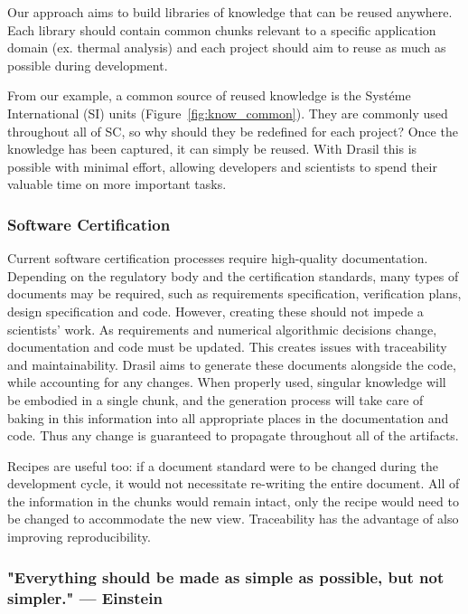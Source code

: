 \documentclass{sig-alternate-05-2015}
\newcommand{\lss}{Drasil}
\begin{document}
Our approach aims to build libraries of knowledge that can be reused anywhere.
Each library should contain common chunks relevant to a specific application
domain (ex. thermal analysis) and each project should aim to reuse as much as
possible during development.

From our example, a common source of reused knowledge is the Syst\'{e}me
International (SI) units (Figure~\ref{fig:know_common}). They are commonly
used throughout all of SC, so why should they be redefined for each
project? Once the knowledge has been captured, it can simply be reused.
With \lss{} this is possible with minimal effort, allowing developers and
scientists to spend their valuable time on more important tasks.

\subsubsection{Software Certification} \label{sssec:adv_cert}

Current software certification processes require high-quality documentation.
Depending on the regulatory body and the certification standards, many
types of documents may be required, such as requirements specification,
verification plans, design specification and code. 
However, creating these should not impede a scientists' work.  As requirements
and numerical algorithmic decisions change, documentation and code must be
updated.  This creates issues with traceability and maintainability.
\lss{} aims to generate these documents alongside the code, while accounting
for any changes. When properly used, singular knowledge will be embodied in
a single chunk, and the generation process will take care of baking in this
information into all appropriate places in the documentation and code.  Thus
any change is guaranteed to propagate throughout all of the artifacts.

Recipes are useful too: if a document standard were to be changed during the
development cycle, it would not necessitate re-writing the entire document. All
of the information in the chunks would remain intact, only the recipe would need
to be changed to accommodate the new view. Traceability has the advantage
of also improving reproducibility.

\subsubsection{"Everything should be made as simple as possible, but not
  simpler."  --- Einstein} \label{sssec:adv_simple}
\end{document}

